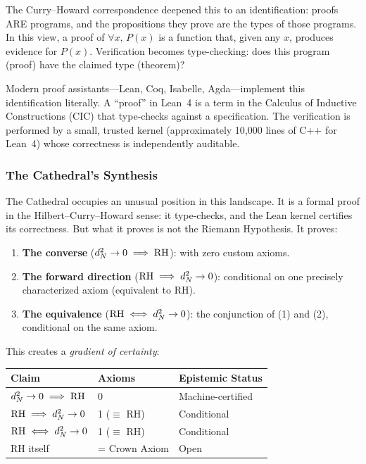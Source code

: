 The Curry--Howard correspondence deepened this to an identification:
proofs ARE programs, and the propositions they prove are the types
of those programs. In this view, a proof of $\forall x,\, P(x)$
is a function that, given any $x$, produces evidence for $P(x)$.
Verification becomes type-checking: does this program (proof) have
the claimed type (theorem)?

Modern proof assistants---Lean, Coq, Isabelle, Agda---implement
this identification literally. A ``proof'' in Lean~4 is a term in
the Calculus of Inductive Constructions (CIC) that type-checks
against a specification. The verification is performed by a small,
trusted kernel (approximately 10{,}000 lines of C++ for Lean~4)
whose correctness is independently auditable.

\subsubsection{The Cathedral's Synthesis}

The Cathedral occupies an unusual position in this landscape.
It is a formal proof in the Hilbert--Curry--Howard sense: it
type-checks, and the Lean kernel certifies its correctness. But
what it proves is not the Riemann Hypothesis. It proves:

\begin{enumerate}
  \item \textbf{The converse} ($d_N^2 \to 0 \implies \mathrm{RH}$):
    with zero custom axioms.
  \item \textbf{The forward direction} ($\mathrm{RH} \implies d_N^2 \to 0$):
    conditional on one precisely characterized axiom (equivalent
    to RH).
  \item \textbf{The equivalence} ($\mathrm{RH} \iff d_N^2 \to 0$):
    the conjunction of (1) and (2), conditional on the same axiom.
\end{enumerate}

This creates a \emph{gradient of certainty}:
\begin{center}
\small
\begin{tabular}{@{}lll@{}}
\toprule
\textbf{Claim} & \textbf{Axioms} & \textbf{Epistemic Status} \\
\midrule
$d_N^2 \to 0 \implies \mathrm{RH}$ & 0 & Machine-certified \\
$\mathrm{RH} \implies d_N^2 \to 0$ & 1 ($\equiv$ RH) & Conditional \\
$\mathrm{RH} \iff d_N^2 \to 0$ & 1 ($\equiv$ RH) & Conditional \\
RH itself & = Crown Axiom & Open \\
\bottomrule
\end{tabular}
\end{center}

